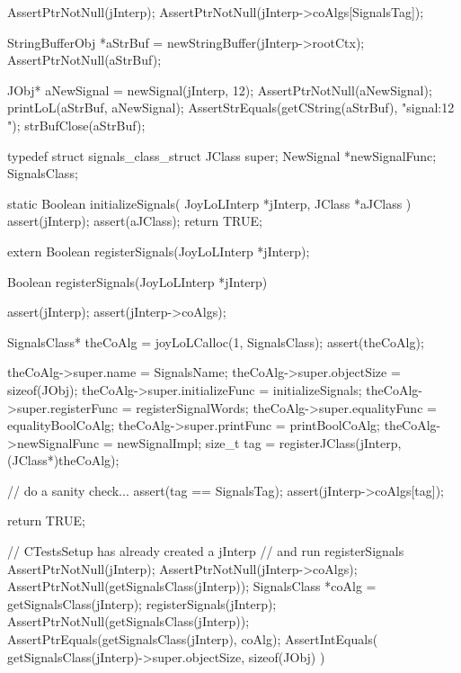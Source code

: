 
\startCTest
  AssertPtrNotNull(jInterp);
  AssertPtrNotNull(jInterp->coAlgs[SignalsTag]);

  StringBufferObj *aStrBuf = newStringBuffer(jInterp->rootCtx);
  AssertPtrNotNull(aStrBuf);
  
  JObj* aNewSignal = newSignal(jInterp, 12);
  AssertPtrNotNull(aNewSignal);
  printLoL(aStrBuf, aNewSignal);
  AssertStrEquals(getCString(aStrBuf), "signal:12 ");
  strBufClose(aStrBuf);
\stopCTest
\stopTestCase
\stopTestSuite

\startTestSuite[registerSignals]

\startCHeader
typedef struct signals_class_struct {
  JClass     super;
  NewSignal *newSignalFunc;
} SignalsClass;

\stopCHeader

\startCCode
static Boolean initializeSignals(
  JoyLoLInterp *jInterp,
  JClass       *aJClass
) {
  assert(jInterp);
  assert(aJClass);
  return TRUE;
}
\stopCCode

\startCHeader
extern Boolean registerSignals(JoyLoLInterp *jInterp);
\stopCHeader
{}

\startCCode
Boolean registerSignals(JoyLoLInterp *jInterp) {
  assert(jInterp);
  assert(jInterp->coAlgs);
  
  SignalsClass* theCoAlg
    = joyLoLCalloc(1, SignalsClass);
  assert(theCoAlg);
  
  theCoAlg->super.name           = SignalsName;
  theCoAlg->super.objectSize     = sizeof(JObj);
  theCoAlg->super.initializeFunc = initializeSignals;
  theCoAlg->super.registerFunc   = registerSignalWords;
  theCoAlg->super.equalityFunc   = equalityBoolCoAlg;
  theCoAlg->super.printFunc      = printBoolCoAlg;
  theCoAlg->newSignalFunc        = newSignalImpl;
  size_t tag =
    registerJClass(jInterp, (JClass*)theCoAlg);
  
  // do a sanity check...
  assert(tag == SignalsTag);
  assert(jInterp->coAlgs[tag]);
   
  return TRUE;
}
\stopCCode


\startCTest
  // CTestsSetup has already created a jInterp
  // and run registerSignals
  AssertPtrNotNull(jInterp);
  AssertPtrNotNull(jInterp->coAlgs);
  AssertPtrNotNull(getSignalsClass(jInterp));
  SignalsClass *coAlg = getSignalsClass(jInterp);
  registerSignals(jInterp);
  AssertPtrNotNull(getSignalsClass(jInterp));
  AssertPtrEquals(getSignalsClass(jInterp), coAlg);
  AssertIntEquals(
    getSignalsClass(jInterp)->super.objectSize,
    sizeof(JObj)
  )
\stopCTest
\stopTestCase
\stopTestSuite
